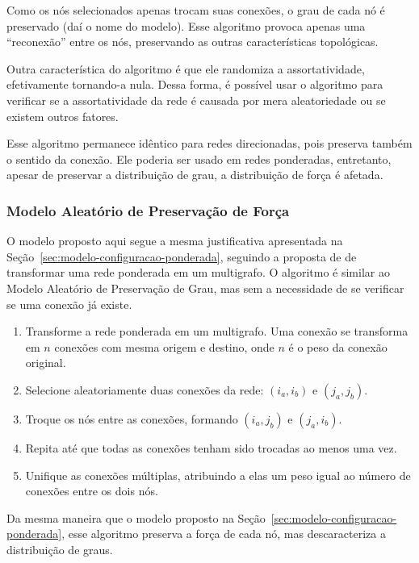 \documentclass[12pt,a4paper]{article}
\theoremstyle{hypo}
\begin{document}
Como os nós selecionados apenas trocam suas conexões, o grau de cada nó é preservado (daí o nome do modelo). Esse algoritmo provoca apenas uma \enquote{reconexão} entre os nós, preservando as outras características topológicas.

Outra característica do algoritmo é que ele randomiza a assortatividade, efetivamente tornando-a nula. Dessa forma, é possível usar o algoritmo para verificar se a assortatividade da rede é causada por mera aleatoriedade ou se existem outros fatores.

Esse algoritmo permanece idêntico para redes direcionadas, pois preserva também o sentido da conexão. Ele poderia ser usado em redes ponderadas, entretanto, apesar de preservar a distribuição de grau, a distribuição de força é afetada.

\subsubsection{Modelo Aleatório de Preservação de Força}

O modelo proposto aqui segue a mesma justificativa apresentada na Seção~\ref{sec:modelo-configuracao-ponderada}, seguindo a proposta de \cite{Newman2004-by} de transformar uma rede ponderada em um multigrafo.
O algoritmo é similar ao Modelo Aleatório de Preservação de Grau, mas sem a necessidade de se verificar se uma conexão já existe.

\begin{enumerate}
\item Transforme a rede ponderada em um multigrafo. Uma conexão se transforma em $n$ conexões com mesma origem e destino, onde $n$ é o peso da conexão original.
\item Selecione aleatoriamente duas conexões da rede: $(i_a, i_b)$ e $(j_a, j_b)$.
\item Troque os nós entre as conexões, formando $(i_a, j_b)$ e $(j_a, i_b)$. 
\item Repita até que todas as conexões tenham sido trocadas ao menos uma vez.
\item Unifique as conexões múltiplas, atribuindo a elas um peso igual ao número de conexões entre os dois nós.
\end{enumerate}

Da mesma maneira que o modelo proposto na Seção~\ref{sec:modelo-configuracao-ponderada}, esse algoritmo preserva a força de cada nó, mas descaracteriza a distribuição de graus.
\end{document}
